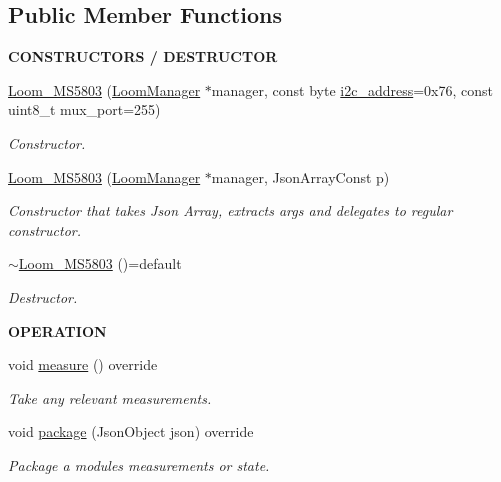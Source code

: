 \subsection*{Public Member Functions}
\begin{Indent}{\bf C\+O\+N\+S\+T\+R\+U\+C\+T\+O\+RS / D\+E\+S\+T\+R\+U\+C\+T\+OR}\par
\begin{DoxyCompactItemize}
\item 
\hyperlink{class_loom___m_s5803_aa10fe4021a423e9ee4bcfa7879be505a}{Loom\+\_\+\+M\+S5803} (\hyperlink{class_loom_manager}{Loom\+Manager} $\ast$manager, const byte \hyperlink{class_loom_i2_c_sensor_a6ff389c1f015152a9ebfccb037d3d90e}{i2c\+\_\+address}=0x76, const uint8\+\_\+t mux\+\_\+port=255)
\begin{DoxyCompactList}\small\item\em Constructor. \end{DoxyCompactList}\item 
\hyperlink{class_loom___m_s5803_a26e351679e5e1ec58052a8cc6763053c}{Loom\+\_\+\+M\+S5803} (\hyperlink{class_loom_manager}{Loom\+Manager} $\ast$manager, Json\+Array\+Const p)
\begin{DoxyCompactList}\small\item\em Constructor that takes Json Array, extracts args and delegates to regular constructor. \end{DoxyCompactList}\item 
\hyperlink{class_loom___m_s5803_a97d45c05c8057838b804e5b94f261ff6}{$\sim$\+Loom\+\_\+\+M\+S5803} ()=default
\begin{DoxyCompactList}\small\item\em Destructor. \end{DoxyCompactList}\end{DoxyCompactItemize}
\end{Indent}
\begin{Indent}{\bf O\+P\+E\+R\+A\+T\+I\+ON}\par
\begin{DoxyCompactItemize}
\item 
void \hyperlink{class_loom___m_s5803_a6c776fb6cb23d626cf5d6e3094c443a0}{measure} () override
\begin{DoxyCompactList}\small\item\em Take any relevant measurements. \end{DoxyCompactList}\item 
void \hyperlink{class_loom___m_s5803_a994abd7bfb62ece7b47bd595d70603b9}{package} (Json\+Object json) override
\begin{DoxyCompactList}\small\item\em Package a modules measurements or state. \end{DoxyCompactList}\end{DoxyCompactItemize}
\end{Indent}
